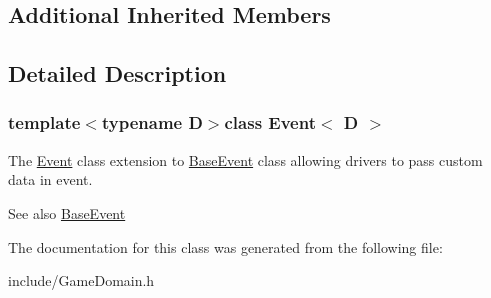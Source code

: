 \subsection*{Additional Inherited Members}


\subsection{Detailed Description}
\subsubsection*{template$<$typename D$>$class Event$<$ D $>$}

The \hyperlink{classEvent}{Event} class extension to \hyperlink{classBaseEvent}{Base\+Event} class allowing drivers to pass custom data in event. 

\begin{DoxySeeAlso}{See also}
\hyperlink{classBaseEvent}{Base\+Event} 
\end{DoxySeeAlso}


The documentation for this class was generated from the following file\+:\begin{DoxyCompactItemize}
\item 
include/Game\+Domain.\+h\end{DoxyCompactItemize}
